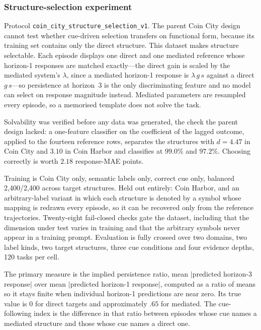 \subsubsection{Structure-selection experiment}
\label{app:exp3-structure-selection}

Protocol \texttt{coin\_city\_structure\_selection\_v1}. The parent Coin City
design cannot test whether cue-driven selection transfers on functional form,
because its training set contains only the direct structure. This dataset makes
structure selectable. Each episode displays one direct and one mediated
reference whose horizon-1 responses are matched exactly---the direct gain is
scaled by the mediated system's $\lambda$, since a mediated horizon-1 response
is $\lambda\,g\,s$ against a direct $g\,s$---so persistence at horizon~3 is the
only discriminating feature and no model can select on response magnitude
instead. Mediated parameters are resampled every episode, so a memorised
template does not solve the task.

Solvability was verified before any data was generated, the check the parent
design lacked: a one-feature classifier on the coefficient of the lagged
outcome, applied to the fourteen reference rows, separates the structures with
$d=4.47$ in Coin City and $3.10$ in Coin Harbor and classifies at $99.0\%$ and
$97.2\%$. Choosing correctly is worth $2.18$ response-MAE points.

Training is Coin City only, semantic labels only, correct cue only, balanced
2{,}400/2{,}400 across target structures. Held out entirely: Coin Harbor, and an
arbitrary-label variant in which each structure is denoted by a symbol whose
mapping is redrawn every episode, so it can be recovered only from the reference
trajectories. Twenty-eight fail-closed checks gate the dataset, including that
the dimension under test varies in training and that the arbitrary symbols never
appear in a training prompt. Evaluation is fully crossed over two domains, two
label kinds, two target structures, three cue conditions and four evidence
depths, 120 tasks per cell.

The primary measure is the implied persistence ratio, mean $|$predicted
horizon-3 response$|$ over mean $|$predicted horizon-1 response$|$, computed as a
ratio of means so it stays finite when individual horizon-1 predictions are near
zero. Its true value is $0$ for direct targets and approximately $.65$ for
mediated. The cue-following index is the difference in that ratio between
episodes whose cue names a mediated structure and those whose cue names a direct
one.

